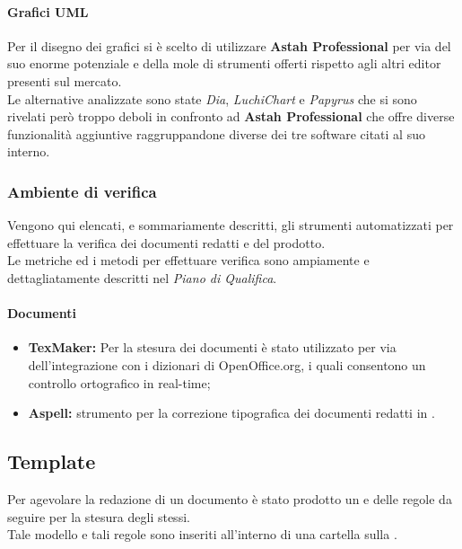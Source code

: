     \paragraph{Grafici UML}
      Per il disegno dei grafici  si è scelto di utilizzare \textbf{Astah Professional} per via del suo enorme potenziale e della mole di strumenti offerti
      rispetto agli altri editor presenti sul mercato.\\
      Le alternative analizzate sono state \emph{Dia}, \emph{LuchiChart} e \emph{Papyrus} che si sono rivelati però troppo deboli in confronto ad \textbf{Astah Professional} che offre
      diverse funzionalità aggiuntive raggruppandone diverse dei tre software citati al suo interno.
  \subsubsection{Ambiente di verifica}
    Vengono qui elencati, e sommariamente descritti, gli strumenti automatizzati per effettuare la verifica dei documenti redatti e del  prodotto.\\
    Le metriche ed i metodi per effettuare verifica sono ampiamente e dettagliatamente descritti nel \emph{Piano di Qualifica}.\\
    \paragraph{Documenti}
      \begin{itemize}
        \item \textbf{TexMaker: }Per la stesura dei documenti è stato utilizzato  per via dell'integrazione con i dizionari di OpenOffice.org, i quali consentono un controllo ortografico in real-time;
        \item \textbf{Aspell: }strumento per la correzione tipografica dei documenti redatti in \glossaryItem{\LaTeX}.
      \end{itemize}
  
  \subsection{Template}
    Per agevolare la redazione di un documento è stato prodotto un  e delle regole da seguire per la stesura degli stessi.\\
    Tale modello e tali regole sono inseriti all'interno di una cartella  sulla .
